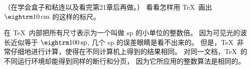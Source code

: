 \dangerexercise （在学会盒子和粘连以及看完第21章后再做。）
看看怎样用 \TeX\ 画出 $\rm10\,cm$ 的这样的标尺。
\answer {}

\danger 在 \TeX\ 内部把所有尺寸表示为一个叫做 sp 的小单位的整数倍。%
因为可见光的波长近似等于 $\rm100\,sp$, 几个 sp 的误差眼睛是看不出来的。%
但是，\TeX\ 非常仔细地进行计算，使得在不同计算机上得到的结果相同。%
对同一文档，\TeX\ 的不同运行环境却能得到同样的断行和分页，
因为它所应用的整数算法是\hbox{相同的。}

